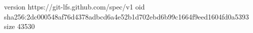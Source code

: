 version https://git-lfs.github.com/spec/v1
oid sha256:2dc000548af76d4378adbcd6a4e52b1d702ebd6b99c1664f9eed1604fd0a5393
size 43530
